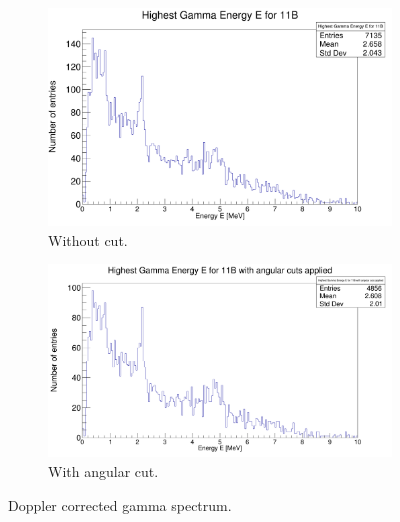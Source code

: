 \documentclass{report}
\begin{document}
\begin{figure}[ht]
\begin{subfigure}{.5\textwidth}
  \centering
  \includegraphics[width=\linewidth]{gamma_spec_new.png}
  \caption{Without cut.}
  \label{fig:sub-first}
\end{subfigure}
\begin{subfigure}{.5\textwidth}
  \centering
  \includegraphics[width=\linewidth]{gamma_spec_cut.png}
  \caption{With angular cut.}
  \label{fig:sub-second}
\end{subfigure}
\caption{Doppler corrected gamma spectrum.}
\label{fig:gamma_spec_cut}
\end{figure}
\end{document}
